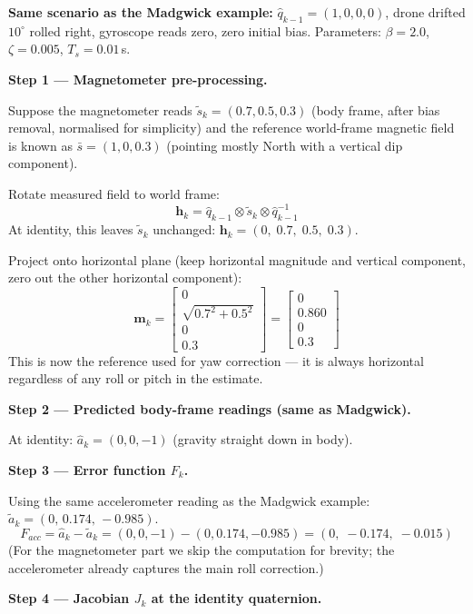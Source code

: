 \documentclass[12pt, a4paper]{article}
\begin{document}
\begin{notebox}
  \textbf{Same scenario as the Madgwick example:}
  $\hat{q}_{k-1} = (1,0,0,0)$, drone drifted $10^\circ$ rolled right,
  gyroscope reads zero, zero initial bias.
  Parameters: $\beta = 2.0$,\; $\zeta = 0.005$,\; $T_s = 0.01$\,s.

  \medskip
  \textbf{Step 1 --- Magnetometer pre-processing.}

  Suppose the magnetometer reads
  $\tilde{s}_k = (0.7, 0.5, 0.3)$ (body frame, after bias removal,
  normalised for simplicity) and the reference world-frame magnetic field
  is known as $\bar{s} = (1, 0, 0.3)$ (pointing mostly North with a
  vertical dip component).

  Rotate measured field to world frame:
  \[
    \mathbf{h}_k
    = \hat{q}_{k-1} \otimes \tilde{s}_k \otimes \hat{q}_{k-1}^{-1}
  \]
  At identity, this leaves $\tilde{s}_k$ unchanged:
  $\mathbf{h}_k = (0,\; 0.7,\; 0.5,\; 0.3)$.

  Project onto horizontal plane (keep horizontal magnitude and vertical
  component, zero out the other horizontal component):
  \[
    \mathbf{m}_k
    = \begin{bmatrix}0 \\ \sqrt{0.7^2+0.5^2} \\ 0 \\ 0.3\end{bmatrix}
    = \begin{bmatrix}0 \\ 0.860 \\ 0 \\ 0.3\end{bmatrix}
  \]
  This is now the reference used for yaw correction --- it is always
  horizontal regardless of any roll or pitch in the estimate.

  \medskip
  \textbf{Step 2 --- Predicted body-frame readings (same as Madgwick).}

  At identity: $\hat{a}_k = (0, 0, -1)$ (gravity straight down in body).

  \medskip
  \textbf{Step 3 --- Error function $F_k$.}

  Using the same accelerometer reading as the Madgwick example:
  $\tilde{a}_k = (0,\, 0.174,\, -0.985)$.
  \[
    F_{acc} = \hat{a}_k - \tilde{a}_k
    = (0,0,-1) - (0,0.174,-0.985)
    = (0,\; -0.174,\; -0.015)
  \]
  (For the magnetometer part we skip the computation for brevity;
  the accelerometer already captures the main roll correction.)

  \medskip
  \textbf{Step 4 --- Jacobian $J_k$ at the identity quaternion.}


\end{notebox}
\end{document}
